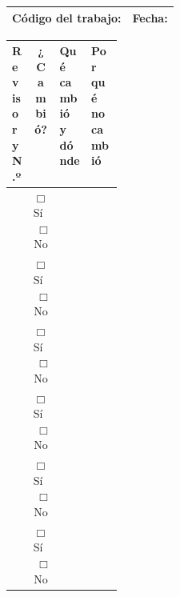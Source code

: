 \documentclass{academic-report}
\begin{document}
\vspace{0.3em}\noindent
\begin{tabularx}{\linewidth}{|X|X|}
\hline
\textbf{Código del trabajo:} & \textbf{Fecha:} \\[0.5em]
\hline
\end{tabularx}

\vspace{0.5em}\noindent
\begin{tabularx}{\linewidth}{|p{0.16\linewidth}|c|X|X|}
\hline
\textbf{Revisor y N.º} & \textbf{¿Cambió?} & \textbf{Qué cambió y dónde} & \textbf{Por qué no cambió} \\
\hline
 & $\mdlgwhtsquare$ Sí\ \ $\mdlgwhtsquare$ No & & \rule[-2.3cm]{0pt}{2.3cm} \\
\hline
 & $\mdlgwhtsquare$ Sí\ \ $\mdlgwhtsquare$ No & & \rule[-2.3cm]{0pt}{2.3cm} \\
\hline
 & $\mdlgwhtsquare$ Sí\ \ $\mdlgwhtsquare$ No & & \rule[-2.3cm]{0pt}{2.3cm} \\
\hline
 & $\mdlgwhtsquare$ Sí\ \ $\mdlgwhtsquare$ No & & \rule[-2.3cm]{0pt}{2.3cm} \\
\hline
 & $\mdlgwhtsquare$ Sí\ \ $\mdlgwhtsquare$ No & & \rule[-2.3cm]{0pt}{2.3cm} \\
\hline
 & $\mdlgwhtsquare$ Sí\ \ $\mdlgwhtsquare$ No & & \rule[-2.3cm]{0pt}{2.3cm} \\
\hline
\end{tabularx}
\end{document}

